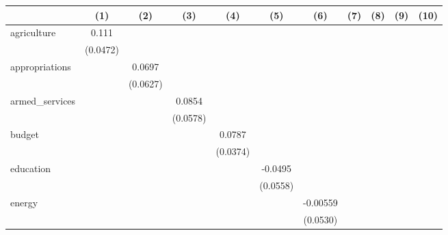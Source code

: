 \begin{tabular}{l*{10}{c}}
\toprule
                    &\multicolumn{1}{c}{(1)}&\multicolumn{1}{c}{(2)}&\multicolumn{1}{c}{(3)}&\multicolumn{1}{c}{(4)}&\multicolumn{1}{c}{(5)}&\multicolumn{1}{c}{(6)}&\multicolumn{1}{c}{(7)}&\multicolumn{1}{c}{(8)}&\multicolumn{1}{c}{(9)}&\multicolumn{1}{c}{(10)}\\
\midrule
agriculture         &       0.111&            &            &            &            &            &            &            &            &            \\
                    &    (0.0472)&            &            &            &            &            &            &            &            &            \\
appropriations      &            &      0.0697&            &            &            &            &            &            &            &            \\
                    &            &    (0.0627)&            &            &            &            &            &            &            &            \\
armed\_services      &            &            &      0.0854&            &            &            &            &            &            &            \\
                    &            &            &    (0.0578)&            &            &            &            &            &            &            \\
budget              &            &            &            &      0.0787&            &            &            &            &            &            \\
                    &            &            &            &    (0.0374)&            &            &            &            &            &            \\
education           &            &            &            &            &     -0.0495&            &            &            &            &            \\
                    &            &            &            &            &    (0.0558)&            &            &            &            &            \\
energy              &            &            &            &            &            &    -0.00559&            &            &            &            \\
                    &            &            &            &            &            &    (0.0530)&            &            &            &            \\

\end{tabular}
